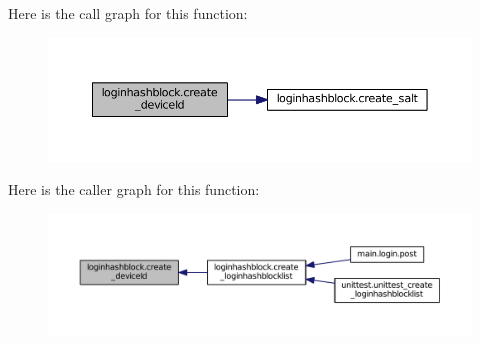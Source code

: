 Here is the call graph for this function\+:\nopagebreak
\begin{figure}[H]
\begin{center}
\leavevmode
\includegraphics[width=350pt]{namespaceloginhashblock_a1bd31fe2f0ea4e6673127d72b6c42826_cgraph}
\end{center}
\end{figure}




Here is the caller graph for this function\+:
\nopagebreak
\begin{figure}[H]
\begin{center}
\leavevmode
\includegraphics[width=350pt]{namespaceloginhashblock_a1bd31fe2f0ea4e6673127d72b6c42826_icgraph}
\end{center}
\end{figure}


